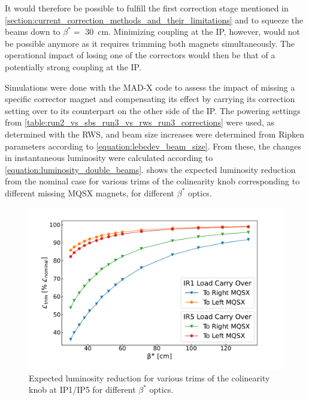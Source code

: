 It would therefore be possible to fulfill the first correction stage mentioned in \cref{section:current_correction_methods_and_their_limitations} and to squeeze the beams down to \(\beta^{\ast} =\) \qty{30}{\centi\meter}.
Minimizing coupling at the IP, however, would not be possible anymore as it requires trimming both magnets simultaneously.
The operational impact of losing one of the correctors would then be that of a potentially strong coupling at the IP.

Simulations were done with the MAD-X code to assess the impact of missing a specific corrector magnet and compensating its effect by carrying its correction setting over to its counterpart on the other side of the IP.
The powering settings from \cref{table:run2_vs_sbs_run3_vs_rws_run3_corrections} were used, as determined with the RWS, and beam size increases were determined from Ripken parameters according to \cref{equation:lebedev_beam_size}.
From these, the changes in instantaneous luminosity were calculated according to \cref{equation:luminosity_double_beams}.
 shows the expected luminosity reduction from the nominal case for various trims of the colinearity knob corresponding to different missing MQSX magnets, for different \(\beta^{\ast}\) optics.

\begin{figure}[!htb]
    \centering
    \includegraphics*[width=\textwidth]{Figures/IR_Coupling_Correction/lumi_vs_betastars_colin_trims.pdf}
    \caption{Expected luminosity reduction for various trims of the colinearity knob at IP\num{1}/IP\num{5} for different \(\beta^{\ast}\) optics.}
    \label{figure:lumi_vs_trims_vs_betastars}
\end{figure}

